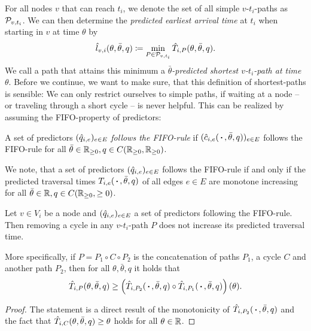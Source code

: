 For all nodes $v$ that can reach $t_i$, we denote the set of all simple $v$-$t_i$-paths as $\mathcal{P}_{v,t_i}$.
We can then determine the \emph{predicted earliest arrival time} at $t_i$ when starting in $v$ at time $\theta$ by
\[
    \hat l_{v,i}(\theta, \bar\theta, q) \coloneqq \min_{P \in \mathcal{P}_{v,t_i}} \hat T_{i, P}(\theta,\bar\theta, q).
\]
We call a path that attains this minimum a \emph{$\bar\theta$-predicted shortest $v$-$t_i$-path at time $\theta$}.
Before we continue, we want to make sure, that this definition of shortest-paths is sensible:
We can only restrict ourselves to simple paths, if waiting at a node -- or traveling through a short cycle -- is never helpful.
This can be realized by assuming the FIFO-property of predictors:
\begin{definition}
    A set of predictors $(\hat q_{i,e})_{e\in E}$ \emph{follows the FIFO-rule} if $(\hat c_{i,e}(\,\boldsymbol{\cdot}\,, \bar\theta, q))_{e\in E}$ follows the FIFO-rule for all $\bar\theta\in\mathbb{R}_{\geq0}, q\in{C}{\left({\mathbb{R}_{\geq0}},{\mathbb{R}_{\geq0}}\right)}$.
\end{definition}

We note, that a set of predictors $(\hat q_{i,e})_{e\in E}$ follows the FIFO-rule if and only if the predicted traversal times $T_{i,e}(\,\boldsymbol{\cdot}\,, \bar\theta, q)$ of all edges $e\in E$ are monotone increasing for all $\bar\theta\in\mathbb{R}, q\in{C}{\left({\mathbb{R}_{\geq0}},{\geq0}\right)}$.

\begin{proposition}\label{prop:removing-cycles-in-fifo-graphs}
    Let $v\in V_i$ be a node and  $(\hat q_{i,e})_{e\in E}$  a set of predictors following the FIFO-rule.
    Then removing a cycle in any $v$-$t_i$-path $P$ does not increase its predicted traversal time.

    More specifically, if $P=P_1\circ C \circ P_2$ is the concatenation of paths $P_1$, a cycle $C$ and another path $P_2$, then for all $\theta,\bar\theta,q$ it holds that
    \[
        \hat T_{i,P}(\theta,\bar\theta,q) \geq \left(
        \hat T_{i,P_2}(\,\boldsymbol{\cdot}\,,\bar\theta,q)
        \circ \hat T_{i,P_1}(\,\boldsymbol{\cdot}\,,\bar\theta,q)
    \right)(\theta).
    \]
\end{proposition}
\begin{proof}
The statement is a direct result of the monotonicity of $\hat T_{i,P_2}(\,\boldsymbol{\cdot}\,,\bar\theta,q)$ and the fact that $\hat T_{i,C}(\theta,\bar\theta,q) \geq \theta$ holds for all $\theta\in\mathbb{R}$.\end{proof}


